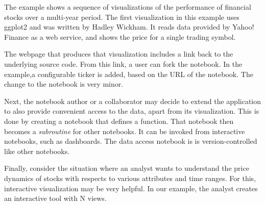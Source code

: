 The example shows a sequence of visualizations of the performance
of financial stocks over a multi-year period. The first visualization
in this example uses ggplot2 and was written by Hadley Wickham.
It reads data provided by Yahoo! Finance as a web service, and shows
the price for a single trading symbol.

The webpage that produces that visualization includes a link back to
the underlying source code. From this link, a user can fork the notebook.
In the example,a configurable ticker is added, based on the URL of
the notebook. The change to the notebook is very minor.

Next, the notebook author or a collaborator may decide to extend
the application to also provide convenient access to the data,
apart from its visualization.
This is done by creating a notebook that defines a function.
That notebook then becomes a \emph{subroutine} for other notebooks.
It can be invoked from interactive notebooks, such as dashboards.
The data access notebook is is version-controlled like other notebooks.

Finally, consider the situation where an analyst wants to understand
the price dynamics of stocks with respects to various attributes and
time ranges. For this, interactive visualization may be very helpful.
In our example, the analyst creates an interactive tool with N views.



%
